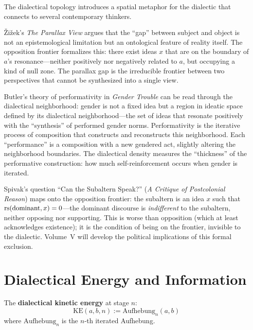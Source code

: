 \begin{interpretation}
The dialectical topology introduces a spatial metaphor for the dialectic
that connects to several contemporary thinkers.

\v{Z}i\v{z}ek's \textit{The Parallax View} argues that the ``gap'' between
subject and object is not an epistemological limitation but an ontological
feature of reality itself. The opposition frontier formalizes this: there
exist ideas $x$ that are on the boundary of $a$'s resonance---neither
positively nor negatively related to $a$, but occupying a kind of null zone.
The parallax gap is the irreducible frontier between two perspectives that
cannot be synthesized into a single view.

Butler's theory of performativity in \textit{Gender Trouble} can be read
through the dialectical neighborhood: gender is not a fixed idea but a
region in ideatic space defined by its dialectical neighborhood---the set
of ideas that resonate positively with the ``synthesis'' of performed
gender norms. Performativity is the iterative process of composition that
constructs and reconstructs this neighborhood. Each ``performance'' is a
composition with a new gendered act, slightly altering the neighborhood
boundaries. The dialectical density measures the ``thickness'' of the
performative construction: how much self-reinforcement occurs when gender
is iterated.

Spivak's question ``Can the Subaltern Speak?'' (\textit{A Critique of
Postcolonial Reason}) maps onto the opposition frontier: the subaltern
is an idea $x$ such that $\mathrm{rs}(\mathrm{dominant}, x) = 0$---the dominant
discourse is \emph{indifferent} to the subaltern, neither opposing nor
supporting. This is worse than opposition (which at least acknowledges
existence); it is the condition of being on the frontier, invisible to
the dialectic. Volume~V will develop the political implications of this
formal exclusion.
\end{interpretation}

\section{Dialectical Energy and Information}

\begin{definition}
\label{def:kinetic-energy}
The \textbf{dialectical kinetic energy} at stage $n$:
\[
\mathrm{KE}(a, b, n) := \mathrm{Aufhebung}_n(a, b)
\]
where $\mathrm{Aufhebung}_n$ is the $n$-th iterated Aufhebung.
\end{definition}

